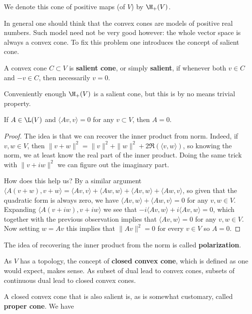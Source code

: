 We denote this cone of positive maps (of $V$) by $\H_{+}(V)$.

In general one should think that the convex cones are models of positive real numbers. Such model need not be very good however: the whole vector space is always a convex cone. To fix this problem one introduces the concept of salient cone.

\begin{maar}
	A convex cone $C \subset V$ is \textbf{salient cone}, or simply \textbf{salient}, if whenever both $v \in C$ and $-v \in C$, then necessarily $v = 0$.
\end{maar}

Conveniently enough $\H_{+}(V)$ is a salient cone, but this is by no means trivial property.

\begin{lem}\label{inj_compr}
	If $A \in \L(V)$ and $\langle A v, v \rangle = 0$ for any $v \subset V$, then $A = 0$.
\end{lem} 
\begin{proof}
	The idea is that we can recover the inner product from norm. Indeed, if $v, w \in V$, then $\|v + w\|^2 = \|v\|^2 + \|w\|^2 + 2 \Re(\langle v, w \rangle)$, so knowing the norm, we at least know the real part of the inner product. Doing the same trick with $\|v + i w\|^2$ we can figure out the imaginary part.

	How does this help us? By a similar argument $\langle A(v + w), v + w \rangle = \langle A v, v \rangle + \langle A w, w \rangle + \langle A v, w\rangle + \langle A w, v \rangle$, so given that the quadratic form is always zero, we have $\langle A v, w \rangle + \langle A w, v \rangle = 0$ for any $v, w \in V$. Expanding $\langle A (v + i w), v + i w \rangle$ we see that $-i \langle A v, w \rangle + i \langle A v, w \rangle = 0$, which together with the previous observation implies that $\langle A v , w \rangle = 0$ for any $v, w \in V$. Now setting $w = A v$ this implies that $\|A v\|^{2} = 0$ for every $v \in V$ so $A = 0$.
\end{proof}

The idea of recovering the inner product from the norm is called \textbf{polarization}.

As $V$ has a topology, the concept of \textbf{closed convex cone}, which is defined as one would expect, makes sense. As subset of dual lead to convex cones, subsets of continuous dual lead to closed convex cones.

A closed convex cone that is also salient is, as is somewhat customary, called \textbf{proper cone}. We have

